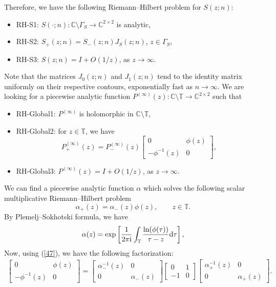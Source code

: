 \documentclass[10pt,a4paper]{amsart}
\numberwithin{equation}{section}
\newcommand{\C}{{\mathbb C}}
\newcommand{\T}{{\mathbb T}}
\newcommand{\al}{\alpha}
\newcommand{\Ga}{\Gamma}
\begin{document}
		Therefore, we have the following Riemann--Hilbert problem for $S(z;n)$:
		\begin{itemize}\itemsep=0pt
			\item {\rm RH-S1:} $ S(\cdot;n)\colon\C\setminus \Ga_S \to \C^{2\times2}$ is analytic,
			\item {\rm RH-S2:} $S_{+}(z;n)=S_{-}(z;n) J_{S}(z;n)$, $z \in \Ga_S$,
			\item {\rm RH-S3:} $ S(z;n)=I+O(1/z)$, as $z \to \infty$.
		\end{itemize}
		Note that the matrices $J_0(z;n)$ and $J_1(z;n)$ tend to the identity matrix uniformly on their respective contours, exponentially fast as $n \to \infty$.	We are looking for a piecewise analytic function $P^{(\infty)}(z)\colon \C \setminus \T \to \C^{2\times2}$ such that
\begin{itemize}\itemsep=0pt
			\item {\rm RH-Global1:} $P^{(\infty)}$ is holomorphic in $\C \setminus \T$,
			\item {\rm RH-Global2:} for $z\in \T$, we have \begin{equation}\label{44}
				P_+^{(\infty)}(z)=P_-^{(\infty)}(z) \begin{bmatrix}
					0 & \phi(z) \\
					- \phi^{-1}(z) & 0
				\end{bmatrix},
			\end{equation}
			\item {\rm RH-Global3:} $P^{(\infty)}(z)=I+O(1/z)$, as $z \to \infty$.
		\end{itemize}
		We can find a piecewise analytic function $\al$ which solves the following scalar multiplicative Riemann--Hilbert problem \begin{equation}\label{47}
			\al_+(z)=\al_-(z)\phi(z), \qquad z \in \T.
		\end{equation}
		By Plemelj--Sokhotski formula, we have \begin{equation}\label{45}
			\al(z)=\exp \left[ \frac{1}{2 \pi {\rm i} } \int_{\T} \frac{\ln(\phi(\tau))}{\tau-z}{\rm d}\tau \right],
		\end{equation}
		Now, using (\ref{47}), we have the following factorization: \begin{gather*}%
			\begin{bmatrix}
				0 & \phi(z) \\
				- \phi^{-1}(z) & 0
			\end{bmatrix}= \begin{bmatrix}
				\al_-^{-1}(z) & 0 \\
				0 & \al_-(z)
			\end{bmatrix} \begin{bmatrix}
				0 & 1 \\
				- 1 & 0
			\end{bmatrix} \begin{bmatrix}
				\al^{-1}_+(z) & 0 \\
				0 & \al_+(z)
			\end{bmatrix}.
		\end{gather*}
\end{document}
